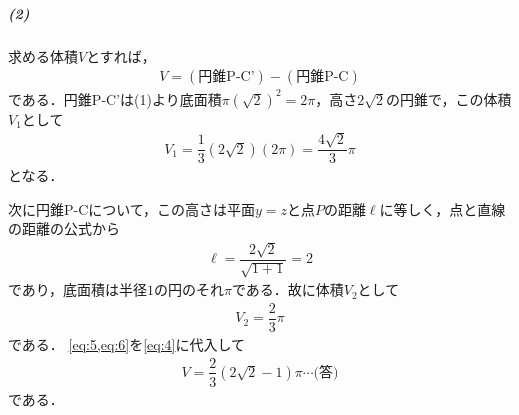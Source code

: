 \documentclass[../../main.tex]{subfiles}
\begin{document}
\subparagraph{(2)}
求める体積$V$とすれば，
\begin{align}
  V=(\text{円錐P-C'})-(\text{円錐P-C}) \label{eq:4}
\end{align}
である．円錐P-C'は(1)より底面積$\pi(\sqrt{2})^2=2\pi$，高さ$2\sqrt{2}$の円錐で，この体積$V_1$として
\begin{align}
  V_1=\dfrac{1}{3}(2\sqrt{2})(2\pi)=\dfrac{4\sqrt{2}}{3}\pi  \label{eq:5}
\end{align}
となる．

次に円錐P-Cについて，この高さは平面$y=z$と点$P$の距離$\ell$に等しく，点と直線の距離の公式から
\begin{align}
  \ell = \dfrac{2\sqrt{2}}{\sqrt{1+1}} = 2
\end{align}
であり，底面積は半径$1$の円のそれ$\pi$である．故に体積$V_2$として
\begin{align}
  V_2=\dfrac{2}{3}\pi \label{eq:6}
\end{align}
である．
\cref{eq:5,eq:6}を\cref{eq:4}に代入して
\begin{align}
  V=\dfrac{2}{3}(2\sqrt{2}-1)\pi\cdots\text{(答)}
\end{align}
である．
\newpage
\end{document}
